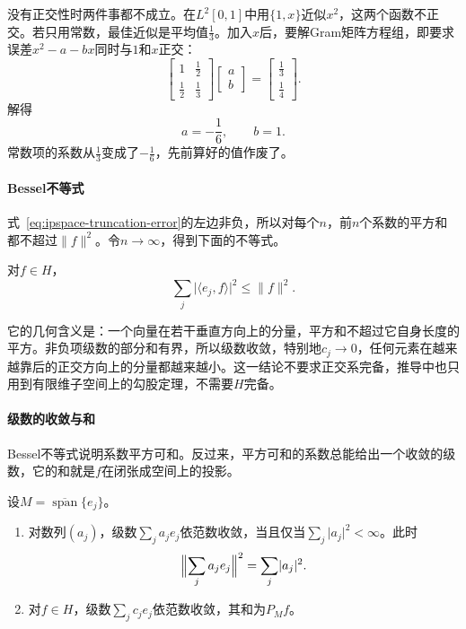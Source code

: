 没有正交性时两件事都不成立。在$L^2[0,1]$中用$\{1,x\}$近似$x^2$，这两个函数不正交。若只用常数，最佳近似是平均值$\tfrac13$。加入$x$后，要解Gram矩阵方程组，即要求误差$x^2-a-bx$同时与$1$和$x$正交：
\[
 \begin{bmatrix}1&\tfrac12\\\tfrac12&\tfrac13\end{bmatrix}
 \begin{bmatrix}a\\b\end{bmatrix}
 =\begin{bmatrix}\tfrac13\\\tfrac14\end{bmatrix}.
\]
解得
\[
 a=-\frac16,\qquad b=1 .
\]
常数项的系数从$\tfrac13$变成了$-\tfrac16$，先前算好的值作废了。

\paragraph{Bessel不等式}
式~\eqref{eq:ipspace-truncation-error}的左边非负，所以对每个$n$，前$n$个系数的平方和都不超过$\lVert f\rVert^2$。令$n\to\infty$，得到下面的不等式。

\begin{theorem}[Bessel不等式]
\label{thm:ipspace-bessel}
对$f\in H$，
\begin{equation}
 \sum_j\lvert\langle e_j,f\rangle\rvert^2\leq\lVert f\rVert^2 .
 \label{eq:ipspace-bessel}
\end{equation}
\end{theorem}

它的几何含义是：一个向量在若干垂直方向上的分量，平方和不超过它自身长度的平方。非负项级数的部分和有界，所以级数收敛，特别地$c_j\to0$，任何元素在越来越靠后的正交方向上的分量都越来越小。这一结论不要求正交系完备，推导中也只用到有限维子空间上的勾股定理，不需要$H$完备。

\paragraph{级数的收敛与和}
Bessel不等式说明系数平方可和。反过来，平方可和的系数总能给出一个收敛的级数，它的和就是$f$在闭张成空间上的投影。

\begin{theorem}[正交展开]
\label{thm:ipspace-orthogonal-expansion}
设$M=\overline{\operatorname{span}}\{e_j\}$。
\begin{enumerate}
 \item 对数列$(a_j)$，级数$\sum_ja_je_j$依范数收敛，当且仅当$\sum_j\lvert a_j\rvert^2<\infty$。此时
 \begin{equation}
  \Bigl\lVert\sum_ja_je_j\Bigr\rVert^2=\sum_j\lvert a_j\rvert^2 .
  \label{eq:ipspace-series-norm}
 \end{equation}
 \item 对$f\in H$，级数$\sum_jc_je_j$依范数收敛，其和为$P_Mf$。
\end{enumerate}
\end{theorem}

